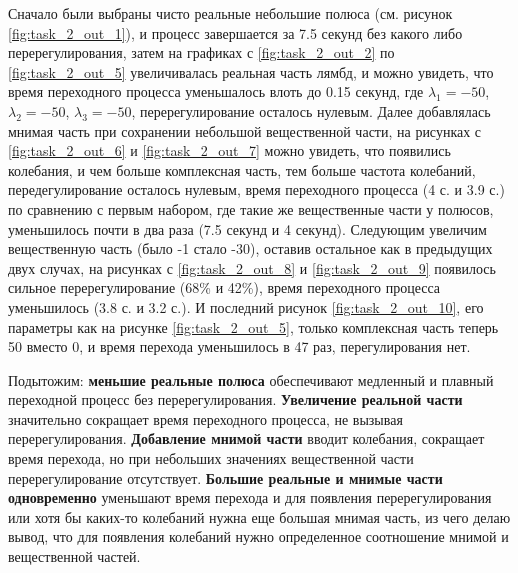 Сначало были выбраны чисто реальные небольшие полюса (см. рисунок \ref{fig:task_2_out_1}), и процесс завершается за 7.5 секунд без какого либо
перерегулирования, затем на графиках с \ref{fig:task_2_out_2} по \ref{fig:task_2_out_5} увеличивалась
реальная часть лямбд, и можно увидеть, что время переходного процесса уменьшалось влоть до 0.15
секунд, где $\lambda_1 = -50$, $\lambda_2 = -50$, $\lambda_3 = -50$, перерегулирование осталось нулевым.
Далее добавлялась мнимая часть при сохранении небольшой вещественной части, на рисунках
с \ref{fig:task_2_out_6} и \ref{fig:task_2_out_7} можно увидеть, что появились колебания, и
чем больше комплексная часть, тем больше частота колебаний, передегулирование осталось нулевым,
время переходного процесса (4 с. и 3.9 с.) по сравнению с первым набором, где такие же вещественные части у полюсов,
уменьшилось почти в два раза (7.5 секунд и 4 секунд). Следующим увеличим вещественную часть (было -1 стало -30),
оставив остальное как в предыдущих двух случах, на рисунках с \ref{fig:task_2_out_8} и \ref{fig:task_2_out_9}
появилось сильное перерегулирование (68\% и 42\%), время переходного процесса уменьшилось
(3.8 с. и 3.2 с.). И последний рисунок \ref{fig:task_2_out_10}, его параметры как на рисунке 
\ref{fig:task_2_out_5}, только комплексная часть теперь 50 вместо 0, и время перехода
уменьшилось в 47 раз, перегулирования нет. 

Подытожим: \textbf{меньшие реальные полюса} обеспечивают медленный и плавный переходной процесс без перерегулирования.
\textbf{Увеличение реальной части} значительно сокращает время переходного процесса, не вызывая перерегулирования.
\textbf{Добавление мнимой части} вводит колебания, сокращает время перехода, но при небольших значениях 
вещественной части перерегулирование отсутствует.
\textbf{Большие реальные и мнимые части одновременно} уменьшают время перехода и для появления
перерегулирования или хотя бы каких-то колебаний нужна еще большая мнимая часть, из чего делаю
вывод, что для появления колебаний нужно определенное соотношение мнимой и вещественной частей.


